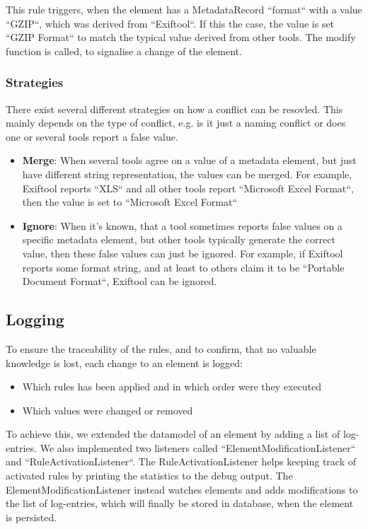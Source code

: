 \documentclass[a4paper,12pt]{article}
\begin{document}
This rule triggers, when the element has a MetadataRecord ``format`` with a value ``GZIP``, which was derived from ``Exiftool``. If this the case, the value is set ``GZIP Format`` to match the typical value derived from other tools.
The modify function is called, to signalise a change of the element.

\subsubsection{Strategies}

There exist several different strategies on how a conflict can be resovled. This mainly depends on the type of conflict, e.g. is it just a naming conflict or does one or several tools report a false value.

\begin{itemize}
\item \textbf{Merge}: When several tools agree on a value of a metadata element, but just have different string representation, the values can be merged. For example, Exiftool reports ``XLS`` and all other tools report ``Microsoft Excel Format``, then the value is set to ``Microsoft Excel Format``
\item \textbf{Ignore}: When it's known, that a tool sometimes reports false values on a specific metadata element, but other tools typically generate the correct value, then these false values can just be ignored. For example, if Exiftool reports some format string, and at least to others claim it to be ``Portable Document Format``, Exiftool can be ignored.

\end{itemize}


\subsection{Logging}

To ensure the traceability of the rules, and to confirm, that no valuable knowledge is lost, each change to an element is logged:
\begin{itemize}
\item Which rules has been applied and in which order were they executed
\item Which values were changed or removed
\end{itemize}

To achieve this, we extended the datamodel of an element by adding a list of log-entries. We also implemented two listeners called ``ElementModificationListener`` and ``RuleActivationListener``. The RuleActivationListener helps keeping track of activated rules by printing the statistics to the debug output.
The ElementModificationListener instead watches elements and adds modifications to the list of log-entries, which will finally be stored in database, when the element is persisted.
\end{document}

